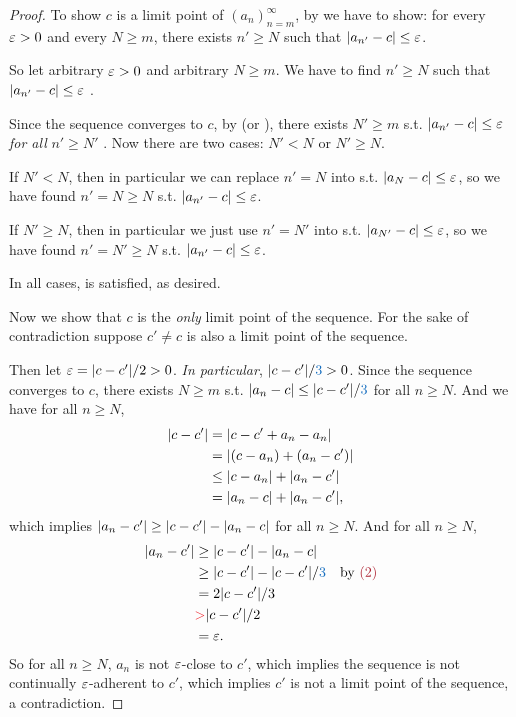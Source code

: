 \begin{proof}
To show \(c\) is a limit point of \((a_n)_{n = m}^{\infty}\), by  we have to show:
for every \(\varepsilon > 0\) and every \(N \ge m\), there exists \(n' \ge N\) such that \(\lvert a_{n'} - c\rvert \le \varepsilon\).

So let arbitrary \(\varepsilon > 0\) and arbitrary \(N \ge m\).
We have to find \(n' \ge N\) such that \(\lvert a_{n'} - c\rvert \le \varepsilon\) .

Since the sequence converges to \(c\), by  (or ),
there exists \(N' \ge m\) s.t. \(\lvert a_{n'} - c\rvert \le \varepsilon\) \emph{for all} \(n' \ge N'\) .
Now there are two cases: \(N' < N\) or \(N' \ge N\).

If \(N' < N\), then in particular we can replace \(n' = N\) into  s.t. \(\lvert a_{N} - c\rvert \le \varepsilon\),
so we have found \(n' = N \ge N\) s.t. \(\lvert a_{n'} - c\rvert \le \varepsilon\).

If \(N' \ge N\), then in particular we just use \(n' = N'\) into  s.t. \(\lvert a_{N'} - c\rvert \le \varepsilon\),
so we have found \(n' = N' \ge N\) s.t. \(\lvert a_{n'} - c\rvert \le \varepsilon\).

In all cases,  is satisfied, as desired.

Now we show that \(c\) is the \emph{only} limit point of the sequence.
For the sake of contradiction suppose \(c' \ne c\) is also a limit point of the sequence.

Then let \(\varepsilon = \lvert c - c'\rvert/2 > 0\).
\emph{In particular}, \(\abs{c - c'}/\BLUE{3} > 0\).
Since the sequence converges to \(c\), there exists \(N \ge m\) s.t. \(\abs{a_n - c} \le \abs{c - c'}/\BLUE{3}\)  for all \(n \ge N\).
And we have for all \(n \ge N\),
\begin{align*}
    \lvert c - c'\rvert & = \lvert c - c' + a_n - a_n\rvert \\
                 & = \lvert(c - a_n) + (a_n - c')\rvert \\
                 & \le \lvert c - a_n\rvert + \lvert a_n - c'\rvert \\
                 & = \lvert a_n - c\rvert + \lvert a_n - c'\rvert,
\end{align*}
which implies \(\lvert a_n - c'\rvert \ge \lvert c - c'\rvert - \lvert a_n - c\rvert\) for all \(n \ge N\).
And for all \(n \ge N\),
\begin{align*}
    \abs{a_n - c'} & \ge \abs{c - c'} - \abs{a_n - c} \\
                   & \ge \abs{c - c'} - \abs{c - c'}/\BLUE{3} & \text{by \MAROON{(2)}} \\
                   & = 2\abs{c - c'}/3 \\
                   & \RED{>} \abs{c - c'}/2 \\
                   & = \varE.
\end{align*}
So for all \(n \ge N\), \(a_n\) is not \(\varepsilon\)-close to \(c'\),
which implies the sequence is not continually \(\varepsilon\)-adherent to \(c'\),
which implies \(c'\) is not a limit point of the sequence, a contradiction.
\end{proof}

